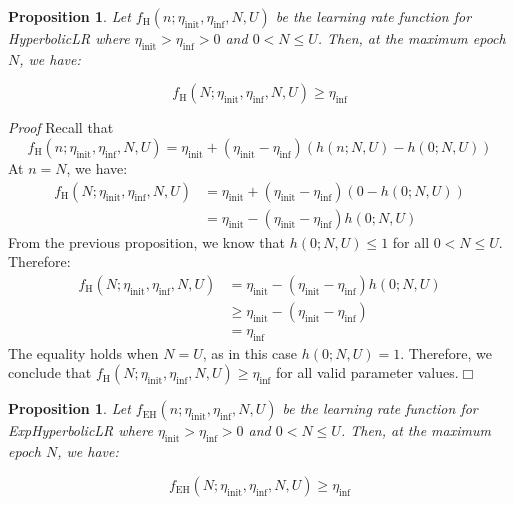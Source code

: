 \documentclass{article}
\theoremstyle{plain}
\newtheorem{proposition}[theorem]{Proposition}
\theoremstyle{definition}
\theoremstyle{remark}
\begin{document}
\begin{proposition}
Let $f_{\text{H}}(n; \eta_\text{init}, \eta_\text{inf}, N, U)$ be the learning rate function for HyperbolicLR where $\eta_\text{init} > \eta_\text{inf} > 0$ and $0 < N \leq U$. Then, at the maximum epoch $N$, we have:

\[ f_{\text{H}}(N; \eta_\text{init}, \eta_\text{inf}, N, U) \geq \eta_\text{inf} \]
\end{proposition}

\noindent \textit{Proof}
Recall that 
\begin{equation}
   f_\text{H}(n; \eta_\text{init}, \eta_\text{inf}, N, U) = \eta_\text{init} + (\eta_\text{init} - \eta_\text{inf}) (h(n; N, U) - h(0; N, U))
   \label{eq:hyperbolic_lr}
\end{equation}
At $n = N$, we have:
\begin{align*}
f_{\text{H}}(N; \eta_\text{init}, \eta_\text{inf}, N, U) &= \eta_\text{init} + (\eta_\text{init} - \eta_\text{inf})(0 - h(0; N, U)) \\
  &= \eta_\text{init} - (\eta_\text{init} - \eta_\text{inf}) h(0; N, U)
\end{align*}
From the previous proposition, we know that $h(0; N, U) \leq 1$ for all $0 < N \leq U$. Therefore:
\begin{align*}
f_{\text{H}}(N; \eta_\text{init}, \eta_\text{inf}, N, U) &= \eta_\text{init} - (\eta_\text{init} - \eta_\text{inf}) h(0; N, U) \\
  &\geq \eta_\text{init} - (\eta_\text{init} - \eta_\text{inf}) \\
  &= \eta_\text{inf}
\end{align*}
The equality holds when $N = U$, as in this case $h(0; N, U) = 1$.
Therefore, we conclude that $f_{\text{H}}(N; \eta_\text{init}, \eta_\text{inf}, N, U) \geq \eta_\text{inf}$ for all valid parameter values.\hfill$\Box$

\begin{proposition}
Let $f_{\text{EH}}(n; \eta_\text{init}, \eta_\text{inf}, N, U)$ be the learning rate function for ExpHyperbolicLR where $\eta_\text{init} > \eta_\text{inf} > 0$ and $0 < N \leq U$. Then, at the maximum epoch $N$, we have:

\[ f_{\text{EH}}(N; \eta_\text{init}, \eta_\text{inf}, N, U) \geq \eta_\text{inf} \]
\end{proposition}
\end{document}
